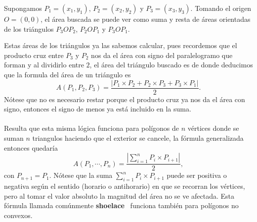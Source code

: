 Supongamos $P_1=(x_1,y_1)$, $P_2=(x_2,y_2)$ y $P_3=(x_3,y_3)$. Tomando el origen $O=(0,0)$, el área buscada se puede ver como suma y resta de áreas orientadas de los triángulos $P_3OP_2$, $P_2OP_1$ y $P_3OP_1$.
\begin{figure}[H]
\centering
{}
\label{fig:shoelace}
\end{figure}
Estas áreas de los triángulos ya las sabemos calcular, pues recordemos que el producto cruz entre $P_3$ y $P_2$ nos da el área con signo del paralelogramo que forman y al dividirlo entre $2$, el área del triángulo buscado es de donde deducimos que la formula del área de un triángulo es
\[
A(P_1,P_2,P_3)=\frac{|P_1 \times P_2 + P_2 \times P_3 + P_3 \times P_1|}{2}.
\]
Nótese que no es necesario restar porque el producto cruz ya nos da el área con signo, entonces el signo de menos ya está incluido en la suma.
\\\\Resulta que esta misma lógica funciona para polígonos de $n$ vértices donde se suman $n$ triangulos haciendo que el exterior se cancele, la fórmula generalizada entonces quedaría
\[
A(P_1,\cdots,P_n)=\frac{|\sum_{i=1}^{n}P_i \times P_{i+1}|}{2},
\]
con $P_{n+1}=P_1$. Nótese que la suma $\sum_{i=1}^{n} P_i \times P_{i+1}$ puede ser positiva o negativa
según el sentido (horario o antihorario) en que se recorran los vértices, pero al tomar el valor
absoluto la magnitud del área no se ve afectada. Esta fórmula llamada comúnmente \textbf{shoelace}~\cite{lecomte2018} funciona también para polígonos no convexos.

